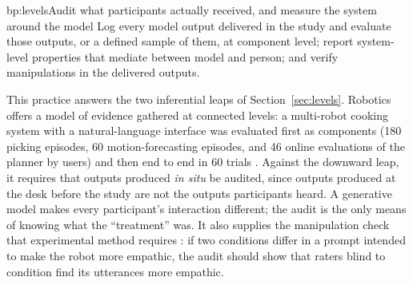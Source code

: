 \begin{practice}{bp:levels}{Audit what participants actually received, and measure the system around the model}
Log every model output delivered in the study and evaluate those outputs, or a
defined sample of them, at component level; report system-level properties
that mediate between model and person; and verify manipulations in the
delivered outputs.
\end{practice}

This practice answers the two inferential leaps of
Section~\ref{sec:levels}. Robotics offers a model of evidence gathered at
connected levels: a multi-robot cooking system with a natural-language
interface was evaluated first as components (180 picking episodes, 60
motion-forecasting episodes, and 46 online evaluations of the planner by
users) and then end to end in 60 trials \cite{wang2025mosaic}. Against the downward leap, it requires that
outputs produced \emph{in situ} be audited, since outputs produced at the
desk before the study are not the outputs participants heard. A generative
model makes every participant's interaction different; the audit is the only
means of knowing what the ``treatment'' was. It also supplies the
manipulation check that experimental method requires
\cite{hoffman2020primer}: if two conditions differ in a prompt intended to
make the robot more empathic, the audit should show that raters blind to
condition find its utterances more empathic.

